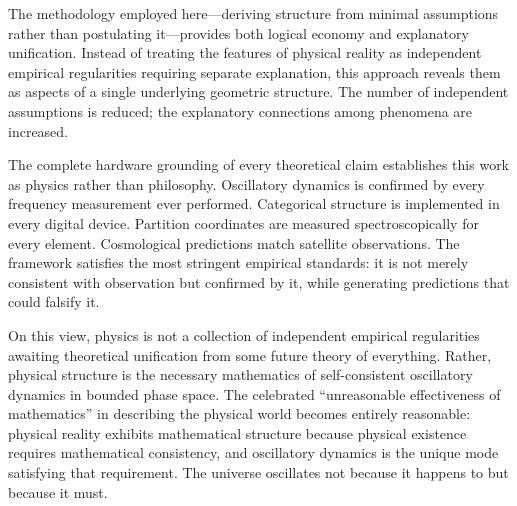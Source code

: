 \documentclass[11pt,a4paper]{article}
\theoremstyle{remark}
\begin{document}
The methodology employed here—deriving structure from minimal assumptions rather than postulating it—provides both logical economy and explanatory unification. Instead of treating the features of physical reality as independent empirical regularities requiring separate explanation, this approach reveals them as aspects of a single underlying geometric structure. The number of independent assumptions is reduced; the explanatory connections among phenomena are increased.

The complete hardware grounding of every theoretical claim establishes this work as physics rather than philosophy. Oscillatory dynamics is confirmed by every frequency measurement ever performed. Categorical structure is implemented in every digital device. Partition coordinates are measured spectroscopically for every element. Cosmological predictions match satellite observations. The framework satisfies the most stringent empirical standards: it is not merely consistent with observation but confirmed by it, while generating predictions that could falsify it.

On this view, physics is not a collection of independent empirical regularities awaiting theoretical unification from some future theory of everything. Rather, physical structure is the necessary mathematics of self-consistent oscillatory dynamics in bounded phase space. The celebrated ``unreasonable effectiveness of mathematics'' in describing the physical world becomes entirely reasonable: physical reality exhibits mathematical structure because physical existence requires mathematical consistency, and oscillatory dynamics is the unique mode satisfying that requirement. The universe oscillates not because it happens to but because it must.




\end{document}
